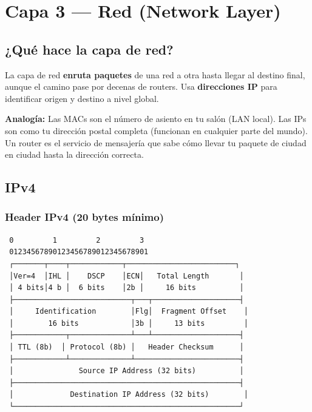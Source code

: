 \chapter{ Capa 3 --- Red (Network Layer)}

\section{ ¿Qué hace la capa de red?}

\begin{concepto}
La capa de red \textbf{enruta paquetes} de una red a otra hasta llegar al
destino final, aunque el camino pase por decenas de routers.
Usa \textbf{direcciones IP} para identificar origen y destino a nivel global.

 \textbf{Analogía:} Las MACs son el número de asiento en tu
salón (LAN local). Las IPs son como tu dirección postal completa (funcionan
en cualquier parte del mundo). Un router es el servicio de mensajería
que sabe cómo llevar tu paquete de ciudad en ciudad hasta la dirección correcta.
\end{concepto}

\section{ IPv4}

\subsection{Header IPv4 (20 bytes mínimo)}

\begin{lstlisting}
 0         1         2         3
 01234567890123456789012345678901
 ┌───────┬────┬────────────┬─────────────────────────┐
 │Ver=4  │IHL │    DSCP    │ECN│   Total Length       │
 │ 4 bits│4 b │  6 bits    │2b │     16 bits          │
 ├───────────────────────────┬───┬────────────────────┤
 │     Identification        │Flg│  Fragment Offset    │
 │        16 bits            │3b │     13 bits         │
 ├────────────┬──────────────┴───┴────────────────────┤
 │ TTL (8b)  │ Protocol (8b) │   Header Checksum      │
 ├────────────┴──────────────┴────────────────────────┤
 │               Source IP Address (32 bits)          │
 ├────────────────────────────────────────────────────┤
 │             Destination IP Address (32 bits)        │
 └────────────────────────────────────────────────────┘
\end{lstlisting}

